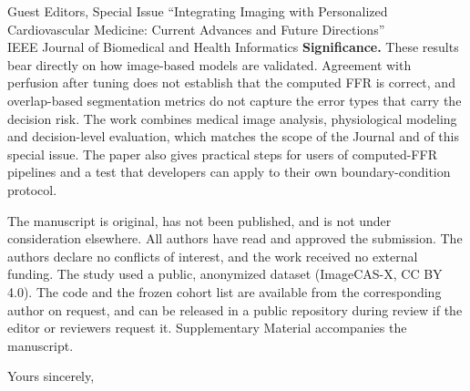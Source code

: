 \documentclass[10pt]{letter}
\begin{document}
\begin{letter}{Guest Editors, Special Issue ``Integrating Imaging with Personalized Cardiovascular Medicine: Current
Advances and Future Directions''\\IEEE Journal of Biomedical and Health Informatics}
\textbf{Significance.} These results bear directly on how image-based models are validated. Agreement with
perfusion after tuning does not establish that the computed FFR is correct, and overlap-based segmentation metrics do not capture the error types that
carry the decision risk. The work combines medical image analysis, physiological modeling and decision-level
evaluation, which matches the scope of the Journal and of this special issue. The paper also gives practical steps for users
of computed-FFR pipelines and a test that developers can apply to their own boundary-condition protocol.

The manuscript is original, has not been published, and is not under consideration elsewhere. All authors have read
and approved the submission. The authors declare no conflicts of interest, and the work received no external funding.
The study used a public, anonymized dataset (ImageCAS-X, CC BY 4.0). The code and the frozen cohort list are available
from the corresponding author on request, and can be released in a public repository during review if the editor
or reviewers request it. Supplementary Material accompanies the manuscript.

\closing{Yours sincerely,}
\end{letter}
\end{document}
